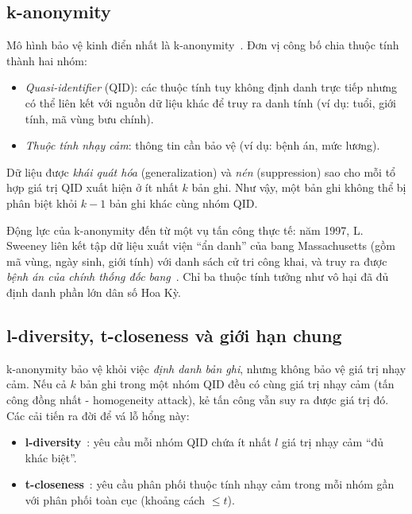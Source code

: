 \subsection{k-anonymity}
Mô hình bảo vệ kinh điển nhất là k-anonymity~\cite{sweeney}. Đơn vị công bố chia thuộc tính thành hai nhóm:
\renewcommand{\labelitemi}{$-$}
\begin{itemize}
	\item \textit{Quasi-identifier} (QID): các thuộc tính tuy không định danh trực tiếp nhưng có thể liên kết với nguồn dữ liệu khác để truy ra danh tính (ví dụ: tuổi, giới tính, mã vùng bưu chính).
	\item \textit{Thuộc tính nhạy cảm}: thông tin cần bảo vệ (ví dụ: bệnh án, mức lương).
\end{itemize}
Dữ liệu được \textit{khái quát hóa} (generalization) và \textit{nén} (suppression) sao cho mỗi tổ hợp giá trị QID xuất hiện ở ít nhất $k$ bản ghi. Như vậy, một bản ghi không thể bị phân biệt khỏi $k-1$ bản ghi khác cùng nhóm QID.

Động lực của k-anonymity đến từ một vụ tấn công thực tế: năm 1997, L. Sweeney liên kết tập dữ liệu xuất viện ``ẩn danh'' của bang Massachusetts (gồm mã vùng, ngày sinh, giới tính) với danh sách cử tri công khai, và truy ra được \textit{bệnh án của chính thống đốc bang}~\cite{sweeney}. Chỉ ba thuộc tính tưởng như vô hại đã đủ định danh phần lớn dân số Hoa Kỳ.

\subsection{l-diversity, t-closeness và giới hạn chung}
k-anonymity bảo vệ khỏi việc \textit{định danh bản ghi}, nhưng không bảo vệ giá trị nhạy cảm. Nếu cả $k$ bản ghi trong một nhóm QID đều có cùng giá trị nhạy cảm (tấn công đồng nhất - homogeneity attack), kẻ tấn công vẫn suy ra được giá trị đó. Các cải tiến ra đời để vá lỗ hổng này:
\begin{itemize}
	\item \textbf{l-diversity}~\cite{ldiversity}: yêu cầu mỗi nhóm QID chứa ít nhất $l$ giá trị nhạy cảm ``đủ khác biệt''.
	\item \textbf{t-closeness}~\cite{tcloseness}: yêu cầu phân phối thuộc tính nhạy cảm trong mỗi nhóm gần với phân phối toàn cục (khoảng cách $\le t$).
\end{itemize}

